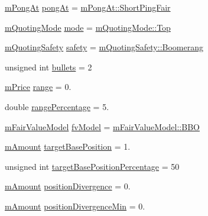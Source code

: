 \begin{DoxyCompactItemize}
\item 
\hyperlink{namespace_k_a6bd1ffa01a02e9cf1302f02774ba013f}{m\+Pong\+At} \hyperlink{struct_k_1_1m_quoting_params_aa1a0a930fab278ae84dba744b9df2346}{pong\+At} = \hyperlink{namespace_k_a6bd1ffa01a02e9cf1302f02774ba013fa102eaf65c3a5f9be2898b918b50c0a09}{m\+Pong\+At\+::\+Short\+Ping\+Fair}
\item 
\hyperlink{namespace_k_aad47eca41d4abcf27209f4b673e7b9e9}{m\+Quoting\+Mode} \hyperlink{struct_k_1_1m_quoting_params_aba9219e91199409f90646b018b900dc6}{mode} = \hyperlink{namespace_k_aad47eca41d4abcf27209f4b673e7b9e9aa4ffdcf0dc1f31b9acaf295d75b51d00}{m\+Quoting\+Mode\+::\+Top}
\item 
\hyperlink{namespace_k_a89330b32d78089edeaa5bc6fe48d605d}{m\+Quoting\+Safety} \hyperlink{struct_k_1_1m_quoting_params_a366be3c92bc258600ccf2d6e93cdd852}{safety} = \hyperlink{namespace_k_a89330b32d78089edeaa5bc6fe48d605da8c9d96b1ef82662dd41a42e8528876b6}{m\+Quoting\+Safety\+::\+Boomerang}
\item 
unsigned int \hyperlink{struct_k_1_1m_quoting_params_a66918388a988312b129d487b71d79136}{bullets} = 2
\item 
\hyperlink{km_8h_a392f9b7f384aa3539bbb890b059f5b8c}{m\+Price} \hyperlink{struct_k_1_1m_quoting_params_a682b5a36477fe4df067e2d6f573e98d8}{range} = 0.
\item 
double \hyperlink{struct_k_1_1m_quoting_params_af8622c6c49ec64f7e1ca24ad14b378e6}{range\+Percentage} = 5.
\item 
\hyperlink{namespace_k_ae4a47201f2511ecc8ab5b412e872b9dd}{m\+Fair\+Value\+Model} \hyperlink{struct_k_1_1m_quoting_params_af91dea72c9736ae247e270dcdd166d30}{fv\+Model} = \hyperlink{namespace_k_ae4a47201f2511ecc8ab5b412e872b9dda2a723053ab15920e0c2ecd25a2ede6f9}{m\+Fair\+Value\+Model\+::\+B\+BO}
\item 
\hyperlink{km_8h_ad4d00888c55a47a8a40ed8020d176086}{m\+Amount} \hyperlink{struct_k_1_1m_quoting_params_a41f7e688e22528d01be7373457b533c0}{target\+Base\+Position} = 1.
\item 
unsigned int \hyperlink{struct_k_1_1m_quoting_params_ae7a7b8af9caac8e6704751916b481c87}{target\+Base\+Position\+Percentage} = 50
\item 
\hyperlink{km_8h_ad4d00888c55a47a8a40ed8020d176086}{m\+Amount} \hyperlink{struct_k_1_1m_quoting_params_a158e860ce785d482b11cf81a6544cbd6}{position\+Divergence} = 0.
\item 
\hyperlink{km_8h_ad4d00888c55a47a8a40ed8020d176086}{m\+Amount} \hyperlink{struct_k_1_1m_quoting_params_aad5a5a67d31446bdd70bbaa464080eff}{position\+Divergence\+Min} = 0.

\end{DoxyCompactItemize}
